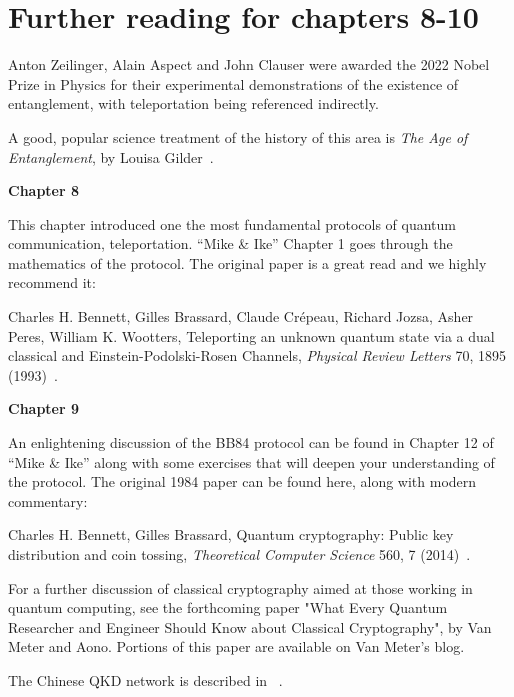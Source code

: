 
\section*{Further reading for chapters 8-10}

Anton Zeilinger, Alain Aspect and John Clauser were awarded the 2022 Nobel Prize in Physics for their experimental demonstrations of the existence of entanglement, with teleportation being referenced indirectly.

A good, popular science treatment of the history of this area is \emph{The Age of Entanglement}, by Louisa Gilder~\cite{gilder08:_age_of_entanglement}.

{\bf Chapter 8}

This chapter introduced one the most fundamental protocols of quantum communication, teleportation. “Mike \& Ike” Chapter 1 goes through the mathematics of the protocol. The original paper is a great read and we highly recommend it:

Charles H. Bennett, Gilles Brassard, Claude Crépeau, Richard Jozsa, Asher Peres, William K. Wootters, Teleporting an unknown quantum state via a dual classical and Einstein-Podolski-Rosen Channels, \emph{Physical Review Letters} 70, 1895 (1993)~\cite{bennett:teleportation}.

{\bf Chapter 9}

An enlightening discussion of the BB84 protocol can be found in Chapter 12 of “Mike \& Ike” along with some exercises that will deepen your understanding of the protocol.
The original 1984 paper can be found here, along with modern commentary:

Charles H. Bennett, Gilles Brassard, Quantum cryptography: Public key distribution and coin tossing, \emph{Theoretical Computer Science} 560, 7 (2014)~\cite{bennett:bb84}.

For a further discussion of classical cryptography aimed at those working in quantum computing, see the forthcoming paper "What Every Quantum Researcher and Engineer Should Know about Classical Cryptography", by Van Meter and Aono.  Portions of this paper are available on Van Meter's blog.

The Chinese QKD network is described in ~\cite{chen2021integrated}.


